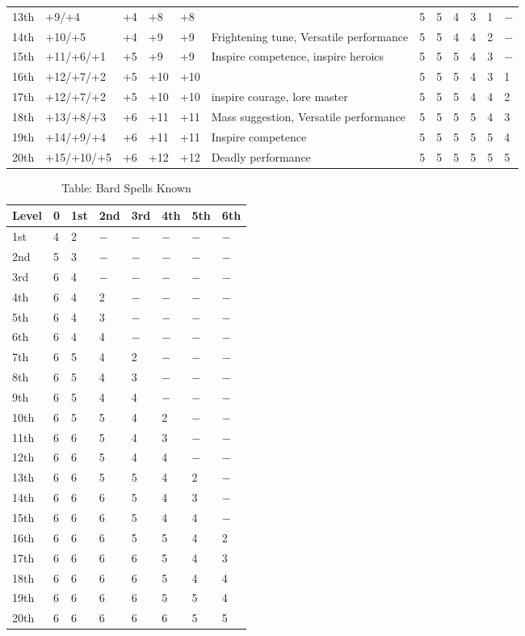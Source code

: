 \begin{table}[]
\begin{tabularx}{\linewidth}{lp{5em}p{1.5em}p{1.5em}p{1.5em}Xllllll}
13th & +9/+4 & +4 & +8 & +8 &  & 5 & 5 & 4 & 3 & 1 & $-$\\
14th & +10/+5 & +4 & +9 & +9 & Frightening tune, Versatile performance & 5 & 5 & 4 & 4 & 2 & $-$\\
15th & +11/+6/+1 & +5 & +9 & +9 & Inspire competence, inspire heroics & 5 & 5 & 5 & 4 & 3 & $-$\\
16th & +12/+7/+2 & +5 & +10 & +10 &  & 5 & 5 & 5 & 4 & 3 & 1\\
17th & +12/+7/+2 & +5 & +10 & +10 & inspire courage, lore master & 5 & 5 & 5 & 4 & 4 & 2\\
18th & +13/+8/+3 & +6 & +11 & +11 & Mass suggestion, Versatile performance & 5 & 5 & 5 & 5 & 4 & 3\\
19th & +14/+9/+4 & +6 & +11 & +11 & Inspire competence & 5 & 5 & 5 & 5 & 5 & 4\\
20th & +15/+10/+5 & +6 & +12 & +12 & Deadly performance & 5 & 5 & 5 & 5 & 5 & 5\\
\end{tabularx}
\end{table}

\begin{table}[]
\caption{Table: Bard Spells Known}
\sffamily
\begin{tabular}{llllllll}
Level&0&1st&2nd&3rd&4th&5th&6th\\
\hline
1st & 4 & 2 & $-$ & $-$ & $-$ & $-$ & $-$\\
2nd & 5 & 3 & $-$ & $-$ & $-$ & $-$ & $-$\\
3rd & 6 & 4 & $-$ & $-$ & $-$ & $-$ & $-$\\
4th & 6 & 4 & 2 & $-$ & $-$ & $-$ & $-$\\
5th & 6 & 4 & 3 & $-$ & $-$ & $-$ & $-$\\
6th & 6 & 4 & 4 & $-$ & $-$ & $-$ & $-$\\
7th & 6 & 5 & 4 & 2 & $-$ & $-$ & $-$\\
8th & 6 & 5 & 4 & 3 & $-$ & $-$ & $-$\\
9th & 6 & 5 & 4 & 4 & $-$ & $-$ & $-$\\
10th & 6 & 5 & 5 & 4 & 2 & $-$ & $-$\\
11th & 6 & 6 & 5 & 4 & 3 & $-$ & $-$\\
12th & 6 & 6 & 5 & 4 & 4 & $-$ & $-$\\
13th & 6 & 6 & 5 & 5 & 4 & 2 & $-$\\
14th & 6 & 6 & 6 & 5 & 4 & 3 & $-$\\
15th & 6 & 6 & 6 & 5 & 4 & 4 & $-$\\
16th & 6 & 6 & 6 & 5 & 5 & 4 & 2\\
17th & 6 & 6 & 6 & 6 & 5 & 4 & 3\\
18th & 6 & 6 & 6 & 6 & 5 & 4 & 4\\
19th & 6 & 6 & 6 & 6 & 5 & 5 & 4\\
20th & 6 & 6 & 6 & 6 & 6 & 5 & 5\\
\end{tabular}
\end{table}

